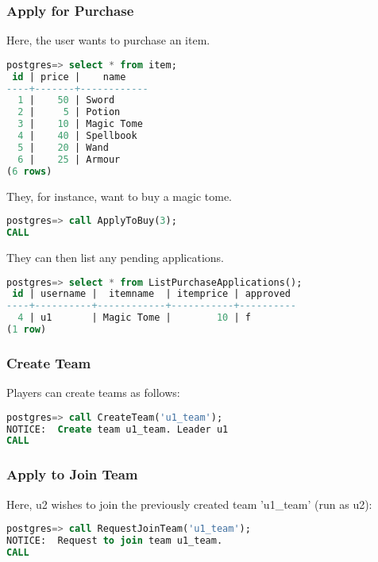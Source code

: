 \subsubsection{Apply for Purchase}

Here, the user wants to purchase an item.

\begin{lstlisting}[language=SQL]
postgres=> select * from item;
 id | price |    name    
----+-------+------------
  1 |    50 | Sword
  2 |     5 | Potion
  3 |    10 | Magic Tome
  4 |    40 | Spellbook
  5 |    20 | Wand
  6 |    25 | Armour
(6 rows)
\end{lstlisting}

They, for instance, want to buy a magic tome.

\begin{lstlisting}[language=SQL]
postgres=> call ApplyToBuy(3);
CALL
\end{lstlisting}

They can then list any pending applications.

\begin{lstlisting}[language=SQL]
postgres=> select * from ListPurchaseApplications();
 id | username |  itemname  | itemprice | approved 
----+----------+------------+-----------+----------
  4 | u1       | Magic Tome |        10 | f
(1 row)
\end{lstlisting}

\subsubsection{Create Team}

Players can create teams as follows:

\begin{lstlisting}[language=SQL]
postgres=> call CreateTeam('u1_team');
NOTICE:  Create team u1_team. Leader u1
CALL
\end{lstlisting}

\subsubsection{Apply to Join Team}

Here, u2 wishes to join the previously created team 'u1\_team' (run as u2):

\begin{lstlisting}[language=SQL]
postgres=> call RequestJoinTeam('u1_team');
NOTICE:  Request to join team u1_team.
CALL
\end{lstlisting}

